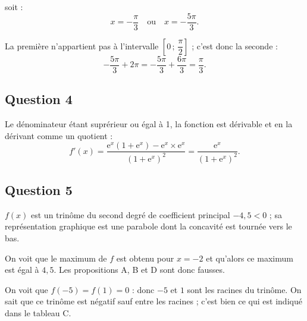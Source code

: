 \documentclass[10pt]{article}
\providecommand{\e}{{\mathrm{e}}}
\begin{document}
soit :
\[
x = -\dfrac{\pi}{3} \quad \text{ou} \quad x = -\dfrac{5\pi}{3}.
\]

La première n'appartient pas à l'intervalle \(\left[0 \,;\, \dfrac{\pi}{2} \right]\) ; c'est donc la seconde :
\[
-\dfrac{5\pi}{3} + 2\pi = -\dfrac{5\pi}{3} + \dfrac{6\pi}{3} = \dfrac{\pi}{3}.
\]

\subsection*{Question 4}

Le dénominateur étant suprérieur ou égal à 1, la fonction est dérivable et en la dérivant comme un quotient :
\[
f'(x) = \dfrac{\e^x (1 + \e^x) - \e^x \times \e^x}{(1 + \e^x)^2} = \dfrac{\e^x}{(1 + \e^x)^2}.
\]

\subsection*{Question 5}

\( f(x) \) est un trinôme du second degré de coefficient principal \(-4{,}5 < 0\) ; sa représentation graphique est une parabole dont la concavité est tournée vers le bas.

On voit que le maximum de \( f \) est obtenu pour \( x = -2 \) et qu'alors ce maximum est égal à \( 4{,}5 \). Les propositions A, B et D sont donc fausses.

On voit que \( f(-5) = f(1) = 0 \) : donc \(-5\) et \(1\) sont les racines du trinôme. On sait que ce trinôme est négatif sauf entre les racines ; c'est bien ce qui est indiqué dans le tableau C.
\end{document}
